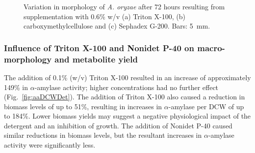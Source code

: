 \begin{figure}[hbtp]
	\centering
	\hspace{0.5cm}
	\hspace{0.5cm}
  \caption{Variation in morphology of \emph{A. oryzae} after 72 hours resulting from supplementation with 0.6\% w/v (a) Triton X-100, (b) carboxymethylcellulose and (c) Sephadex G-200. Bars: 5~mm.}
  \label{fig:PolyDetMorph}
\end{figure}

\subsubsection{Influence of Triton X-100 and Nonidet P-40 on macro-morphology and metabolite yield}

The addition of 0.1\% (w/v) Triton X-100 resulted in an increase of approximately 149\% in $\alpha$-amylase activity; higher concentrations had no further effect (Fig.~\ref{fig:aaDCWDet}). The addition of Triton X-100 also caused a reduction in biomass levels of up to 51\%, resulting in increases in $\alpha$-amylase per DCW of up to 184\%. Lower biomass yields may suggest a negative physiological impact of the detergent and an inhibition of growth. The addition of Nonidet P-40 caused similar reductions in biomass levels, but the resultant increases in $\alpha$-amylase activity were significantly less.

